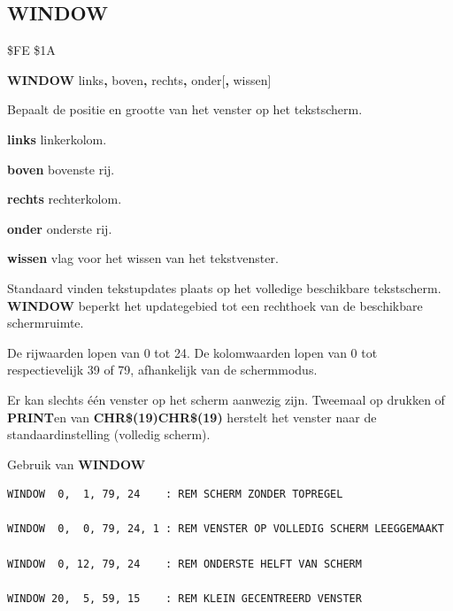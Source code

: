 \subsection{WINDOW}
\begin{description}[leftmargin=2cm,style=nextline]
\item [Token:]    \$FE \$1A

\item [Formaat:]   {\bf WINDOW} links{\bf,} boven{\bf,} rechts{\bf,} onder[{\bf,} wissen]

\item [Gebruik:]    Bepaalt de positie en grootte van het venster op het tekstscherm.

                  {\bf links} linkerkolom.

                  {\bf boven} bovenste rij.

                  {\bf rechts} rechterkolom.

                  {\bf onder} onderste rij.

                  {\bf wissen} vlag voor het wissen van het tekstvenster.

                  Standaard vinden tekstupdates plaats op het volledige beschikbare tekstscherm. {\bf WINDOW} beperkt het updategebied tot een rechthoek van de beschikbare schermruimte.

\item [Opmerkingen:]  De rijwaarden lopen van 0 tot 24. De kolomwaarden lopen van 0 tot respectievelijk 39 of 79, afhankelijk van de schermmodus.

                  Er kan slechts één venster op het scherm aanwezig zijn. Tweemaal op  drukken of {\bf PRINT}en van {\bf CHR\$(19)CHR\$(19)} herstelt het venster naar de standaardinstelling (volledig scherm).

\item [Voorbeelden:] Gebruik van {\bf WINDOW}

\begin{tcolorbox}[colback=black,coltext=white]
\verbatimfont{\codefont}
\begin{verbatim}
WINDOW  0,  1, 79, 24    : REM SCHERM ZONDER TOPREGEL

WINDOW  0,  0, 79, 24, 1 : REM VENSTER OP VOLLEDIG SCHERM LEEGGEMAAKT

WINDOW  0, 12, 79, 24    : REM ONDERSTE HELFT VAN SCHERM

WINDOW 20,  5, 59, 15    : REM KLEIN GECENTREERD VENSTER
\end{verbatim}
\end{tcolorbox}
\end{description}

